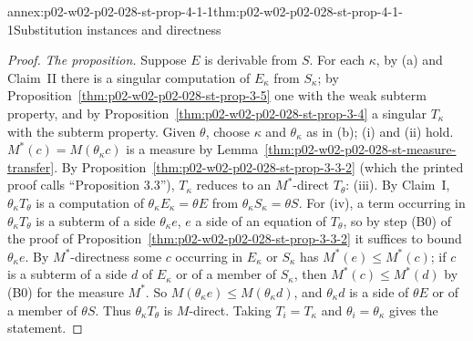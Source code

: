 \begin{annexitem}{annex:p02-w02-p02-028-st-prop-4-1-1}{thm:p02-w02-p02-028-st-prop-4-1-1}{Substitution instances and directness}
\begin{proof}
\emph{The proposition.}  Suppose \(E\) is derivable from \(S\).  For each
\(\kappa\), by (a) and Claim~II there is a singular computation of
\(E_\kappa\) from \(S_\kappa\); by
Proposition~\ref{thm:p02-w02-p02-028-st-prop-3-5} one with the weak subterm
property, and by Proposition~\ref{thm:p02-w02-p02-028-st-prop-3-4} a
singular \(T_\kappa\) with the subterm property.  Given \(\theta\), choose
\(\kappa\) and \(\theta_\kappa\) as in (b); (i) and (ii) hold.
\(M^*(c)=M(\theta_\kappa c)\) is a measure by
Lemma~\ref{thm:p02-w02-p02-028-st-measure-transfer}.  By
Proposition~\ref{thm:p02-w02-p02-028-st-prop-3-3-2} (which the printed proof
calls ``Proposition 3.3''), \(T_\kappa\) reduces to an \(M^*\)-direct
\(T_\theta\): (iii).  By Claim~I, \(\theta_\kappa T_\theta\) is a computation
of \(\theta_\kappa E_\kappa=\theta E\) from \(\theta_\kappa S_\kappa=\theta S\).
For (iv), a term occurring in \(\theta_\kappa T_\theta\) is a subterm of a
side \(\theta_\kappa e\), \(e\) a side of an equation of \(T_\theta\), so by
step (B0) of the proof of
Proposition~\ref{thm:p02-w02-p02-028-st-prop-3-3-2} it suffices to bound
\(\theta_\kappa e\).  By \(M^*\)-directness some \(c\) occurring in
\(E_\kappa\) or \(S_\kappa\) has \(M^*(e)\leq M^*(c)\); if \(c\) is a subterm
of a side \(d\) of \(E_\kappa\) or of a member of \(S_\kappa\), then
\(M^*(c)\leq M^*(d)\) by (B0) for the measure \(M^*\).  So
\(M(\theta_\kappa e)\leq M(\theta_\kappa d)\), and \(\theta_\kappa d\) is a
side of \(\theta E\) or of a member of \(\theta S\).  Thus
\(\theta_\kappa T_\theta\) is \(M\)-direct.  Taking \(T_i=T_\kappa\) and
\(\theta_i=\theta_\kappa\) gives the statement.
\end{proof}
\end{annexitem}

